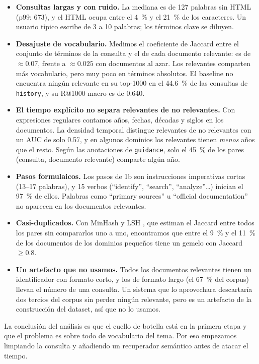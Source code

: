\documentclass[11pt,a4paper]{article}
\begin{document}
\begin{itemize}
  \item \textbf{Consultas largas y con ruido.} La mediana es de 127 palabras sin HTML (p99: 673), y el HTML ocupa entre el 4~\% y el 21~\% de los caracteres. Un usuario típico escribe de 3 a 10 palabras; los términos clave se diluyen.
  \item \textbf{Desajuste de vocabulario.} Medimos el coeficiente de Jaccard \citep{jaccard1912distribution} entre el conjunto de términos de la consulta y el de cada documento relevante: es de $\approx 0.07$, frente a $\approx 0.025$ con documentos al azar. Los relevantes comparten más vocabulario, pero muy poco en términos absolutos. El baseline no encuentra ningún relevante en su top-1000 en el 44.6~\% de las consultas de \texttt{history}, y su R@1000 macro es de 0.640.
  \item \textbf{El tiempo explícito no separa relevantes de no relevantes.} Con expresiones regulares contamos años, fechas, décadas y siglos en los documentos. La densidad temporal distingue relevantes de no relevantes con un AUC de solo 0.57, y en algunos dominios los relevantes tienen \emph{menos} años que el resto. Según las anotaciones de \texttt{guidance}, solo el 45~\% de los pares (consulta, documento relevante) comparte algún año.
  \item \textbf{Pasos formulaicos.} Los pasos de 1b son instrucciones imperativas cortas (13--17 palabras), y 15 verbos (``identify'', ``search'', ``analyze''\ldots) inician el 97~\% de ellos. Palabras como ``primary sources'' u ``official documentation'' no aparecen en los documentos relevantes.
  \item \textbf{Casi-duplicados.} Con MinHash y LSH \citep{broder1997resemblance,indyk1998approximate}, que estiman el Jaccard entre todos los pares sin compararlos uno a uno, encontramos que entre el 9~\% y el 11~\% de los documentos de los dominios pequeños tiene un gemelo con Jaccard $\geq 0.8$.
  \item \textbf{Un artefacto que no usamos.} Todos los documentos relevantes tienen un identificador con formato corto, y los de formato largo (el 67~\% del corpus) llevan el número de una consulta. Un sistema que lo aprovechara descartaría dos tercios del corpus sin perder ningún relevante, pero es un artefacto de la construcción del dataset, así que no lo usamos.
\end{itemize}

La conclusión del análisis es que el cuello de botella está en la primera etapa y que el problema es sobre todo de vocabulario del tema. Por eso empezamos limpiando la consulta y añadiendo un recuperador semántico antes de atacar el tiempo.
\end{document}
